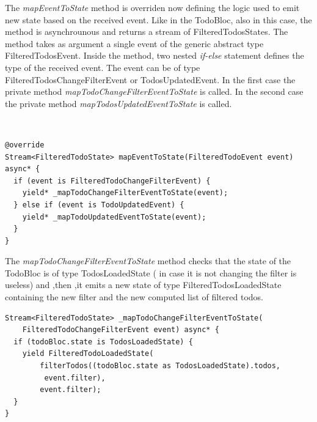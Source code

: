 The \textit{mapEventToState }method is overriden now defining the logic used to emit new state based on the received event. Like in the TodoBloc, also in this case, the method is asynchrounous and returns a stream of FilteredTodosStates. The method takes as argument a single event of the generic abstract type FilteredTodosEvent. Inside the method, two nested \textit{if-else} statement defines the type of the received event. The event can be of type FilteredTodosChangeFilterEvent or TodosUpdatedEvent. In the first case the private method \textit{mapTodoChangeFilterEventToState} is called. In the second case the private method \textit{mapTodosUpdatedEventToState} is called. 
\begin{code}
\mbox{}\\
 \mbox{}
\label{code:2.14}
\begin{verbatim}
@override
Stream<FilteredTodoState> mapEventToState(FilteredTodoEvent event) async* {
  if (event is FilteredTodoChangeFilterEvent) {
    yield* _mapTodoChangeFilterEventToState(event);
  } else if (event is TodoUpdatedEvent) {
    yield* _mapTodoUpdatedEventToState(event);
  }
}
\end{verbatim}
\mbox{}
\end{code}

The \textit{mapTodoChangeFilterEventToState} method  checks that the state of the TodoBloc is of type TodosLoadedState ( in case it is not changing the filter is useless) and ,then ,it emits a new state of type FilteredTodosLoadedState containing the new filter and the new computed list of filtered todos.

\begin{code}
\mbox{}
 \mbox{}
\label{code:2.14}
\begin{verbatim}
Stream<FilteredTodoState> _mapTodoChangeFilterEventToState(
    FilteredTodoChangeFilterEvent event) async* {
  if (todoBloc.state is TodosLoadedState) {
    yield FilteredTodoLoadedState(
        filterTodos((todoBloc.state as TodosLoadedState).todos,
         event.filter),
        event.filter);
  }
}
\end{verbatim}
\mbox{}
\end{code}

